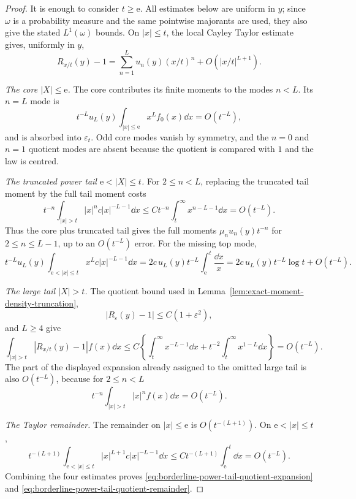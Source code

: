 \begin{proof}
It is enough to consider \(t\ge \mathrm e\).  All estimates below are
uniform in \(y\); since \(\omega\) is a probability measure and the same
pointwise majorants are used, they also give the stated \(L^1(\omega)\)
bounds.  On \(|x|\le t\), the local Cayley Taylor estimate gives, uniformly
in \(y\),
\[
R_{x/t}(y)-1
=\sum_{n=1}^{L}u_n(y)(x/t)^n+O(|x/t|^{L+1}) .
\]

\emph{The core \(|X|\le\mathrm e\).}
The core contributes its finite moments to the modes \(n<L\).  Its \(n=L\)
mode is
\[
t^{-L}u_L(y)\int_{|x|\le\mathrm e}x^Lf_0(x)\dd x=O(t^{-L}),
\]
and is absorbed into \(\varepsilon_t\).  Odd core modes vanish by symmetry,
and the \(n=0\) and \(n=1\) quotient modes are absent because the quotient is
compared with \(1\) and the law is centred.

\emph{The truncated power tail \(\mathrm e<|X|\le t\).}
For \(2\le n<L\), replacing the truncated tail moment by the full tail moment
costs
\[
t^{-n}\int_{|x|>t}|x|^n c|x|^{-L-1}\dd x
\le C t^{-n}\int_t^\infty x^{n-L-1}\dd x
=O(t^{-L}).
\]
Thus the core plus truncated tail gives the full moments
\(\mu_nu_n(y)t^{-n}\) for \(2\le n\le L-1\), up to an \(O(t^{-L})\) error.
For the missing top mode,
\[
t^{-L}u_L(y)\int_{\mathrm e<|x|\le t}x^L c|x|^{-L-1}\dd x
=2c\,u_L(y)t^{-L}\int_{\mathrm e}^{t}\frac{\dd x}{x}
=2c\,u_L(y)t^{-L}\log t+O(t^{-L}).
\]

\emph{The large tail \(|X|>t\).}
The quotient bound used in
Lemma~\ref{lem:exact-moment-density-truncation},
\[
|R_\varepsilon(y)-1|\le C(1+\varepsilon^2),
\]
and \(L\ge4\) give
\[
\int_{|x|>t}|R_{x/t}(y)-1|f(x)\dd x
\le C\left\{\int_t^\infty x^{-L-1}\dd x
+t^{-2}\int_t^\infty x^{1-L}\dd x\right\}
=O(t^{-L}).
\]
The part of the displayed expansion already assigned to the omitted large
tail is also \(O(t^{-L})\), because for \(2\le n<L\)
\[
t^{-n}\int_{|x|>t}|x|^n f(x)\dd x=O(t^{-L}).
\]

\emph{The Taylor remainder.}
The remainder on \(|x|\le\mathrm e\) is \(O(t^{-(L+1)})\).  On
\(\mathrm e<|x|\le t\),
\[
t^{-(L+1)}\int_{\mathrm e<|x|\le t}|x|^{L+1}c|x|^{-L-1}\dd x
\le C t^{-(L+1)}\int_{\mathrm e}^{t}\dd x
=O(t^{-L}).
\]
Combining the four estimates proves
\eqref{eq:borderline-power-tail-quotient-expansion} and
\eqref{eq:borderline-power-tail-quotient-remainder}.
\end{proof}

